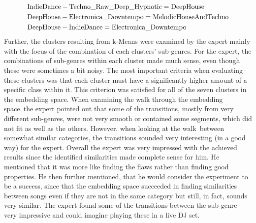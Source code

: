 \begin{equation}
    \centering
    \begin{split}
        &\text{IndieDance} - \text{Techno\_Raw\_Deep\_Hypnotic} = \text{DeepHouse} \\
        &\text{DeepHouse} - \text{Electronica\_Downtempo} = \text{MelodicHouseAndTechno} \\
        &\text{DeepHouse} - \text{IndieDance} = \text{Electronica\_Downtempo}
    \end{split}
    \label{eq:Subtracting-Adding-Clusters-Music}
\end{equation}
Further, the clusters resulting from k-Means were examined by the expert mainly with the focus of the combination of each clusters' sub-genres. For the expert, the combinations of sub-genres within each cluster made much sense, even though these were sometimes a bit noisy. The most important criteria when evaluating these clusters was that each cluster must have a significantly higher amount of a specific class within it. This criterion was satisfied for all of the seven clusters in the embedding space.
\newline
\newline
When examining the \flqq walk through the embedding space\frqq \ the expert pointed out that some of the transitions, mostly from very different sub-genres, were not very smooth or contained some segments, which did not fit as well as the others. However, when looking at the \flqq walk\frqq \ between somewhat similar categories, the transitions sounded very interesting (in a good way) for the expert.
\newline
\newline
Overall the expert was very impressed with the achieved results since the identified similarities made complete sense for him. He mentioned that it was more like finding the flaws rather than finding good properties. He then further mentioned, that he would consider the experiment to be a success, since that the embedding space succeeded in finding similarities between songs even if they are not in the same category but still, in fact, sounds very similar. The expert found some of the transitions between the sub-genre very impressive and could imagine playing these in a live DJ set.

